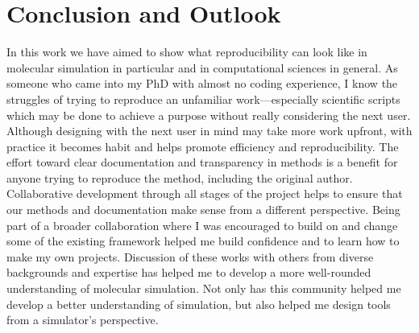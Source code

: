 \chapter{Conclusion and Outlook}
\label{chap:conclusion}

In this work we have aimed to show what reproducibility can look like in molecular simulation in particular and in computational sciences in general.
As someone who came into my PhD with almost no coding experience, I know the struggles of trying to reproduce an unfamiliar work---especially scientific scripts which may be done to achieve a purpose without really considering the next user. 
Although designing with the next user in mind may take more work upfront, with practice it becomes habit and helps promote efficiency and reproducibility. 
The effort toward clear documentation and transparency in methods is a benefit for anyone trying to reproduce the method, including the original author.
Collaborative development through all stages of the project helps to ensure that our methods and documentation make sense from a different perspective.
Being part of a broader collaboration where I was encouraged to build on and change some of the existing framework helped me build confidence and to learn how to make my own projects.
Discussion of these works with others from diverse backgrounds and expertise has helped me to develop a more well-rounded understanding of molecular simulation.
Not only has this community helped me develop a better understanding of simulation, but also helped me design tools from a simulator's perspective.


